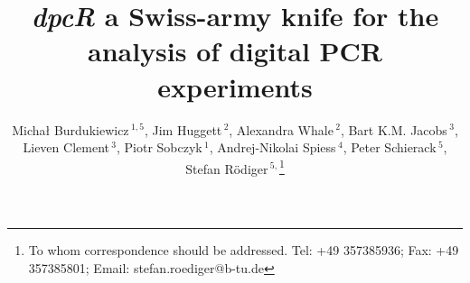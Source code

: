 \documentclass[a4,center,fleqn]{NAR}
\begin{document}
\title{\textit{dpcR} a Swiss-army knife for the analysis of digital PCR experiments}

\author{%
Micha\l{} Burdukiewicz\,$^{1,5}$,
Jim Huggett\,$^{2}$,
Alexandra Whale\,$^{2}$,
Bart K.M. Jacobs\,$^{3}$,
Lieven Clement\,$^{3}$,
Piotr Sobczyk\,$^{1}$,
Andrej-Nikolai Spiess\,$^{4}$,
Peter Schierack\,$^{5}$,
Stefan R\"odiger\,$^{5,}$\footnote{To whom correspondence should be addressed.
Tel: +49 357385936; Fax: +49 357385801; Email: stefan.roediger@b-tu.de}}

\address{%
$^{1}$Department of Genomics, Faculty of Biotechnology, University of Wroc\l{}aw, Wroc\l{}aw, Poland
and
$^{2}$Molecular and Cell Biology Team, LGC, Teddington, United Kingdom
and
$^{3}$Department of Applied Mathematics, Computer Science and Statistics, Ghent University, Belgium
and
$^{4}$University Medical Center Hamburg-Eppendorf, Hamburg, Germany
and
$^{5}$Faculty of Natural Sciences, Brandenburg University of Technology Cottbus--Senftenberg, Gro\ss{}enhainer Str. 57, 01968, Senftenberg, Germany
}


\maketitle
\end{document}
